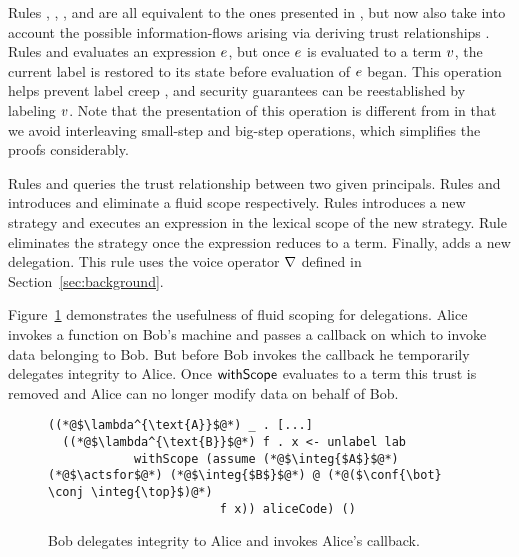 Rules , , ,  and  are all equivalent to the ones presented in \cite{SRMMlio}, but now also take into account the possible information-flows arising via deriving trust relationships \cite{Arden:2015:FA:2859845.2859998}. Rules  and  evaluates an expression $e$, but once $e$ is evaluated to a term $v$, the current label is restored to its state before evaluation of $e$ began. This operation helps prevent label creep \cite{SRMMlio}, and security guarantees can be reestablished by labeling $v$. Note that the presentation of this operation is different from \cite{SRMMlio} in that we avoid interleaving small-step and big-step operations, which simplifies the proofs considerably.

Rules  and  queries the trust relationship between two given principals. Rules  and  introduces and eliminate a fluid scope respectively. Rules  introduces a new strategy and executes an expression in the lexical scope of the new strategy. Rule  eliminates the strategy once the expression reduces to a term. Finally,  adds a new delegation. This rule uses the voice operator $\nabla$ defined in Section~\ref{sec:background}.

Figure~\ref{fig:use-case-for-fluid-scope} demonstrates the usefulness of fluid scoping for delegations. Alice invokes a function on Bob's machine and passes a callback on which to invoke data belonging to Bob. But before Bob invokes the callback he temporarily delegates integrity to Alice. Once $\mathsf{withScope}$ evaluates to a term this trust is removed and Alice can no longer modify data on behalf of Bob.

\begin{figure}
\centering
\begin{lstlisting}
((*@$\lambda^{\text{A}}$@*) _ . [...]
  ((*@$\lambda^{\text{B}}$@*) f . x <- unlabel lab
            withScope (assume (*@$\integ{$A$}$@*) (*@$\actsfor$@*) (*@$\integ{$B$}$@*) @ (*@($\conf{\bot} \conj \integ{\top}$)@*)
                        f x)) aliceCode) ()
\end{lstlisting}
\caption{Bob delegates integrity to Alice and invokes Alice's callback.}
\label{fig:use-case-for-fluid-scope}
\end{figure}

